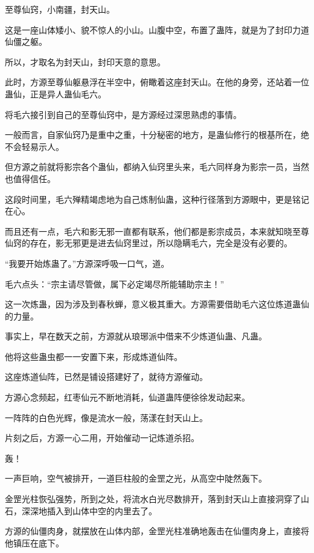 
\begin{this_body}

至尊仙窍，小南疆，封天山。

这是一座山体矮小、貌不惊人的小山。山腹中空，布置了蛊阵，就是为了封印力道仙僵之躯。

所以，才取名为封天山，封印天意的意思。

此时，方源至尊仙躯悬浮在半空中，俯瞰着这座封天山。在他的身旁，还站着一位蛊仙，正是异人蛊仙毛六。

将毛六接引到自己的至尊仙窍中，是方源经过深思熟虑的事情。

一般而言，自家仙窍乃是重中之重，十分秘密的地方，是蛊仙修行的根基所在，绝不会轻易示人。

但方源之前就将影宗各个蛊仙，都纳入仙窍里头来，毛六同样身为影宗一员，当然也值得信任。

这段时间里，毛六殚精竭虑地为自己炼制仙蛊，这种行径落到方源眼中，更是铭记在心。

而且还有一点，毛六和影无邪一直都有联系，他们都是影宗成员，本来就知晓至尊仙窍的存在，影无邪更是进去仙窍里过，所以隐瞒毛六，完全是没有必要的。

“我要开始炼蛊了。”方源深呼吸一口气，道。

毛六点头：“宗主请尽管做，属下必定竭尽所能辅助宗主！”

这一次炼蛊，因为涉及到春秋蝉，意义极其重大。方源需要借助毛六这位炼道蛊仙的力量。

事实上，早在数天之前，方源就从琅琊派中借来不少炼道仙蛊、凡蛊。

他将这些蛊虫都一一安置下来，形成炼道仙阵。

这座炼道仙阵，已然是铺设搭建好了，就待方源催动。

方源心念频起，红枣仙元不断地消耗，仙道蛊阵便徐徐发动起来。

一阵阵的白色光辉，像是流水一般，荡漾在封天山上。

片刻之后，方源一心二用，开始催动一记炼道杀招。

轰！

一声巨响，空气被排开，一道巨柱般的金罡之光，从高空中陡然轰下。

金罡光柱恢弘强势，所到之处，将流水白光尽数排开，落到封天山上直接洞穿了山石，深深地插入到山体中空的内里去了。

方源的仙僵肉身，就摆放在山体内部，金罡光柱准确地轰击在仙僵肉身上，直接将他镇压在底下。


\end{this_body}
